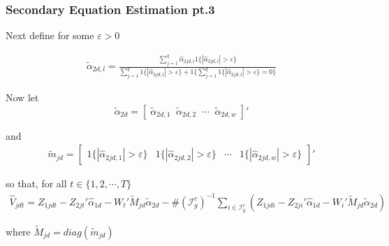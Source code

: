 \documentclass[9pt]{beamer}
\begin{document}
\begin{frame} 
\frametitle{Secondary Equation Estimation pt.3} 

Next define for some $\varepsilon > 0$

\begin{align*} 
\tilde{\alpha}_{2d,l} = \frac{\sum_{j=1}^q \hat{\alpha}_{2jd,l} 1\{ |\hat{\alpha}_{2jd,l}| > \varepsilon \} }{ \sum_{j=1}^q 1\{| \hat{\alpha}_{2jd,l}| > \varepsilon\}     + 1\{\sum_{j=1}^q 1\{ |\hat{\alpha}_{2jd,l}| > \varepsilon\} =0 \} }
\end{align*}

Now let
$$\tilde{\alpha}_{2d} = [ \; \tilde{\alpha}_{2d,1} \;\; \tilde{\alpha}_{2d,2} \;\; \cdots \;\; \tilde{\alpha}_{2d,w}  \; ]'$$

and 
\begin{align*} \tilde{m}_{jd} = \begin{bmatrix}  1\{|\hat{\alpha}_{2jd,1}| > \varepsilon \} &   1\{|\hat{\alpha}_{2jd,2}| > \varepsilon \} & \cdots &   1\{|\hat{\alpha}_{2jd,w}| > \varepsilon \} \end{bmatrix}' \end{align*} 

so that, for all $t\in \{1,2, \cdots , T\}$ 
\begin{align*}
\hat{V}_{jdt} = Z_{1jdt} - Z_{2jt}'\hat{\alpha}_{1d} - W_{t}'\tilde{M}_{jd}\tilde{\alpha}_{2d} - \#(\mathcal{I}^c_g) ^{-1}\sum_{i \in \mathcal{I}^c_g}  (Z_{1jdi} - Z_{2ji}'\hat{\alpha}_{1d} - W_{i}'\tilde{M}_{jd}\tilde{\alpha}_{2d}) 
\end{align*}

where $\tilde{M}_{jd} = diag(\tilde{m}_{jd})$

\end{frame}
\end{document}
